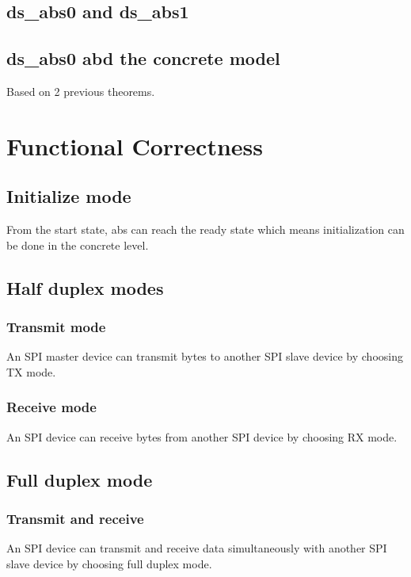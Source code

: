 \documentclass[runningheads]{llncs}
\begin{document}
\subsection{ds\_abs0 and ds\_abs1}

\subsection{ds\_abs0 abd the concrete model}
Based on 2 previous theorems.
 
\section{Functional Correctness}
\subsection{Initialize mode}
\begin{theorem}
From the start state, abs can reach the ready state which means initialization can be done in the concrete level.
\end{theorem}

\subsection{Half duplex modes}

\subsubsection{Transmit mode}
An SPI master device can transmit bytes to another SPI slave device by choosing TX mode.

\subsubsection{Receive mode}
An SPI device can receive bytes from another SPI device by choosing RX mode.

\subsection{Full duplex mode}

\subsubsection{Transmit and receive}
An SPI device can transmit and receive data simultaneously with another SPI slave device by choosing full duplex mode.
\end{document}
